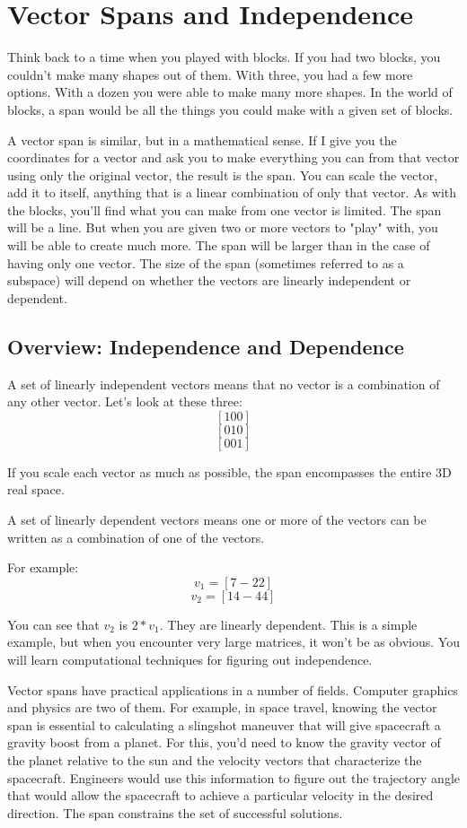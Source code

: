 \chapter{Vector Spans and Independence}
Think back to a time when you played with blocks. If you had two blocks, you couldn't make many shapes out of them. With three, you had a few more options. With a dozen you were able to make many more shapes. In the world of blocks, a span would be all the things you could make with a given set of blocks. 

A vector span is similar, but in a mathematical sense. If I give you the coordinates for a vector and ask you to make everything you can from that vector using only the original vector, the result is the span. You can scale the vector, add it to itself, anything that is a linear combination of only that vector. As with the blocks, you'll find what you can make from one vector is limited. The span will be a line. But when you are given two or more vectors to "play" with, you will be able to create much more. The span will be larger than in the case of having only one vector. The size of the span (sometimes referred to as a subspace) will depend on whether the vectors are linearly independent or dependent. 

\section{Overview: Independence and Dependence}
A set of linearly independent vectors means that no vector is a combination of any other vector. Let's look at these three:
$$[1 0 0]$$
$$[0 1 0]$$
$$[0 0 1]$$

If you scale each vector as much as possible, the span encompasses the entire 3D real space. 

A set of linearly dependent vectors means one or more of the vectors can be written as a combination of one of the vectors.

For example:
$$v_1 = [7 -2 2]$$
$$v_2 = [14 -4 4]$$

You can see that $v_2$ is $2*v_1$. They are linearly dependent. This is a simple example, but when you encounter very large matrices, it won't be as obvious. You will learn computational techniques for figuring out independence.

Vector spans have practical applications in a number of fields. Computer graphics and physics are two of them. For example, in space travel, knowing the vector span is essential to calculating a slingshot maneuver that will give spacecraft a gravity boost from a planet. For this, you'd need to know the gravity vector of the planet relative to the sun and the velocity vectors that characterize the spacecraft. Engineers would use this information to figure out the trajectory angle that would allow the spacecraft to achieve a particular velocity in the desired direction. The span constrains the set of successful solutions.

